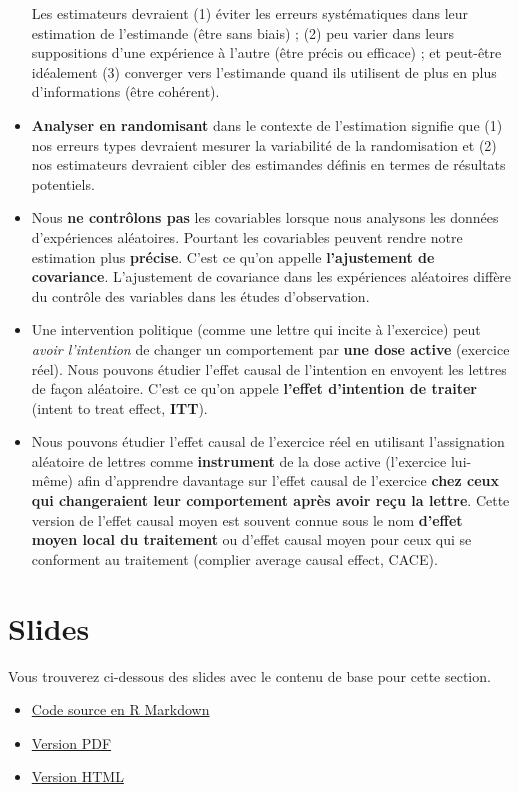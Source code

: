 \documentclass[
  12pt,
]{book}
\begin{document}
\begin{itemize}
  Les estimateurs devraient (1) éviter les erreurs systématiques dans leur estimation de l'estimande (être sans biais) ; (2) peu varier dans leurs suppositions d'une expérience à l'autre (être précis ou efficace) ; et peut-être idéalement (3) converger vers l'estimande quand ils utilisent de plus en plus d'informations (être cohérent).
\item
  \textbf{Analyser en randomisant} dans le contexte de l'estimation signifie que (1) nos erreurs types devraient mesurer la variabilité de la randomisation et (2) nos estimateurs devraient cibler des estimandes définis en termes de résultats potentiels.
\item
  Nous \textbf{ne contrôlons pas} les covariables lorsque nous analysons les données d'expériences aléatoires. Pourtant les covariables peuvent rendre notre estimation plus \textbf{précise}. C'est ce qu'on appelle \textbf{l'ajustement de covariance}. L'ajustement de covariance dans les expériences aléatoires diffère du contrôle des variables dans les études d'observation.
\item
  Une intervention politique (comme une lettre qui incite à l'exercice) peut \emph{avoir l'intention} de changer un comportement par \textbf{une dose active} (exercice réel). Nous pouvons étudier l'effet causal de l'intention en envoyent les lettres de façon aléatoire. C'est ce qu'on appele \textbf{l'effet d'intention de traiter} (intent to treat effect, \textbf{ITT}).
\item
  Nous pouvons étudier l'effet causal de l'exercice réel en utilisant l'assignation aléatoire de lettres comme \textbf{instrument} de la dose active (l'exercice lui-même) afin d'apprendre davantage sur l'effet causal de l'exercice \textbf{chez ceux qui changeraient leur comportement après avoir reçu la lettre}. Cette version de l'effet causal moyen est souvent connue sous le nom \textbf{d'effet moyen local du traitement} ou d'effet causal moyen pour ceux qui se conforment au traitement (complier average causal effect, CACE).
\end{itemize}

\hypertarget{slides-4}{%
\section{Slides}\label{slides-4}}

Vous trouverez ci-dessous des slides avec le contenu de base pour cette section.

\begin{itemize}
\item
  \href{https://egap.github.io/learningdays-resources/Slides/estimation-slides.Rmd}{Code source en R Markdown}
\item
  \href{https://egap.github.io/learningdays-resources/Slides/estimation-slides.pdf}{Version PDF}
\item
  \href{https://egap.github.io/learningdays-resources/Slides/estimation-slides.html}{Version HTML}
\end{itemize}
\end{document}
